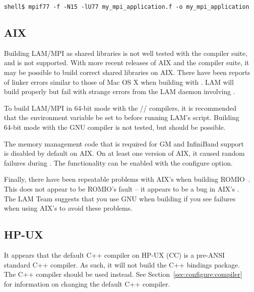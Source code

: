 \lstset{style=lam-cmdline}
\begin{lstlisting}
shell$ mpif77 -f -N15 -lU77 my_mpi_application.f -o my_mpi_application
\end{lstlisting}



\subsection{AIX}

Building LAM/MPI as shared libraries is not well tested with the
 compiler suite, and is not supported.  With more recent
releases of AIX and the compiler suite, it may be possible to build
correct shared libraries on AIX.  There have been reports of linker
errors similar to those of Mac OS X when building with
 .  LAM will build
properly but fail with strange errors from the LAM daemon involving
.

To build LAM/MPI in 64-bit mode with the
// compilers, it is recommended that the
environment variable  be set to 
before running LAM's  script.  Building 64-bit mode
with the GNU compiler is not tested, but should be possible.

The memory management code that is required for GM and InfiniBand
support is disabled by default on AIX.  On at least one version of
AIX, it caused random failures during .  The functionality
can be enabled with the  configure
option.

Finally, there have been repeatable problems with AIX's 
when building ROMIO~\cite{thak99a,thak99b}.  This does not appear to
be ROMIO's fault -- it appears to be a bug in AIX's .  The
LAM Team suggests that you use GNU  when building if you
see failures when using AIX's  to avoid these problems.



\subsection{HP-UX}

It appears that the default C++ compiler on HP-UX (CC) is a pre-ANSI
standard C++ compiler.  As such, it will not build the C++ bindings
package.  The C++ compiler  should be used instead.  See
Section~\ref{sec:configure:compiler} for information on changing the
default C++ compiler.


